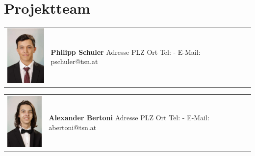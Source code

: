 \section*{Projektteam}

\begin{tabular}[t]{p{2cm} p{8cm}}
    \vspace{0pt}
    \includegraphics[width=2cm]{../images/philipp.jpg}
    &
    \vspace{0pt}
    \textbf{Philipp Schuler}
    \newline Adresse
    \newline PLZ Ort
    \newline
    \newline Tel: -
    \newline E-Mail: pschuler@tsn.at
    \\
\end{tabular}

\begin{tabular}[t]{p{2cm} p{8cm}}
    \vspace{0pt}
    \includegraphics[width=2cm]{../images/alex.jpg}
    &
    \vspace{0pt}
    \textbf{Alexander Bertoni}
    \newline Adresse
    \newline PLZ Ort
    \newline
    \newline Tel: -
    \newline E-Mail: abertoni@tsn.at
    \\
\end{tabular}

